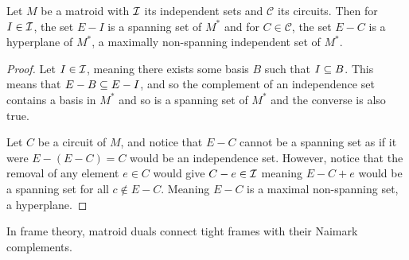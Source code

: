 \begin{prop}
\label{prop:interpeting_the_dual}
    Let $M$ be a matroid with $\mathcal{I}$ its independent sets and $\mathcal{C}$ its circuits. Then for $I\in\mathcal{I}$, the set $E-I$ is a spanning set of $M^*$ and for $C\in\mathcal{C}$, the set $E-C$ is a hyperplane of $M^*$, a maximally non-spanning independent set of $M^*$.
\end{prop}
\begin{proof}
    Let $I\in \mathcal{I}$, meaning there exists some basis $B$ such that $I\subseteq B$. This means that $E-B\subseteq E-I$, and so the complement of an independence set contains a basis in $M^*$ and so is a spanning set of $M^*$ and the converse is also true.
    
    Let $C$ be a circuit of $M$, and notice that $E-C$ cannot be a spanning set as if it were $E-(E-C)=C$ would be an independence set. However, notice that the removal of any element $e\in C$ would give $C-e\in\mathcal{I}$ meaning $E-C+e$ would be a spanning set for all $c\not\in E-C$. Meaning $E-C$ is a maximal non-spanning set, a hyperplane.
\end{proof}

In frame theory, matroid duals connect tight frames with their Naimark complements.

